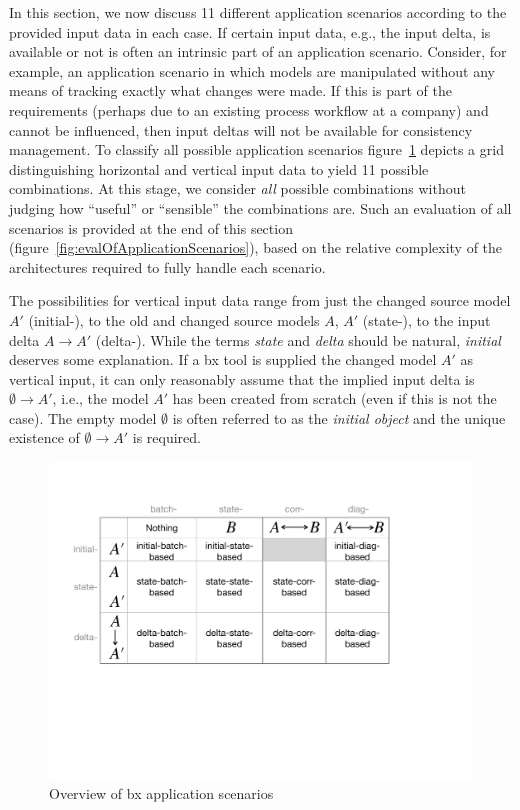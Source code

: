 In this section, we now discuss 11 different application scenarios according to the provided input data in each case.
If certain input data, e.g., the input delta, is available or not is often an intrinsic part of an application scenario.
Consider, for example, an application scenario in which models are manipulated without any means of tracking exactly what changes were made.
If this is part of the requirements (perhaps due to an existing process workflow at a company) and cannot be influenced, then input deltas will not be available for consistency management.
%
To classify all possible application scenarios figure~\ref{fig:architectureLandscape} depicts a grid distinguishing horizontal and vertical input data to yield 11 possible combinations.
At this stage, we consider \emph{all} possible combinations without judging how ``useful'' or ``sensible'' the combinations are.
Such an evaluation of all scenarios is provided at the end of this section (figure~\ref{fig:evalOfApplicationScenarios}), based on the relative complexity of the architectures required to fully handle each scenario. 

The possibilities for vertical input data range from just the changed source model $A'$ (initial-), to the old and changed source models $A$, $A'$ (state-), to the input delta $A \rightarrow A'$ (delta-).
While the terms \emph{state} and \emph{delta} should be natural, \emph{initial} deserves some explanation.
If a bx tool is supplied the changed model $A'$ as vertical input, it can only reasonably assume that the implied input delta is $\emptyset \rightarrow A'$, i.e., the model $A'$ has been created from scratch (even if this is not the case).
The empty model $\emptyset$ is often referred to as the \emph{initial object} and the unique existence of $\emptyset \rightarrow A'$ is required.

\begin{figure}[tb!]
	\centering
	\includegraphics[width=0.9\columnwidth]{diagrams/foundations//ArchitectureLandscape}
	\caption{Overview of bx application scenarios}
	\label{fig:architectureLandscape}
\end{figure}

